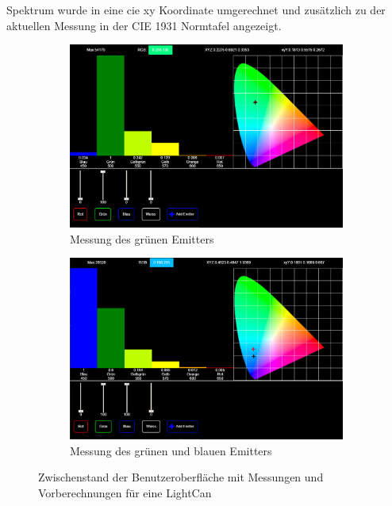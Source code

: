 \documentclass[11pt]{scrartcl}
\begin{document}
Spektrum wurde in eine \ac{cie} xy Koordinate umgerechnet und zusätzlich zu der aktuellen Messung in der CIE 1931 Normtafel angezeigt.
\begin{figure}[H]
    \centering
    \begin{subfigure}[b]{.49\textwidth}
        \includegraphics[width=\textwidth]{images/app_dummy_spectrum_with_xy_and_calc_and_emitters.png}
        \caption{Messung des grünen Emitters}
    \end{subfigure}
    \hfill 
    \begin{subfigure}[b]{.49\textwidth}
        \includegraphics[width=\textwidth]{images/app_dummy_spectrum_with_xy_and_calc_and_emitters_green_blue.png}
        \caption{Messung des grünen und blauen Emitters}\label{fig:calcLightCanMix}
    \end{subfigure}
    \caption{Zwischenstand der Benutzeroberfläche mit Messungen und Vorberechnungen für eine LightCan}
\end{figure}
\end{document}
